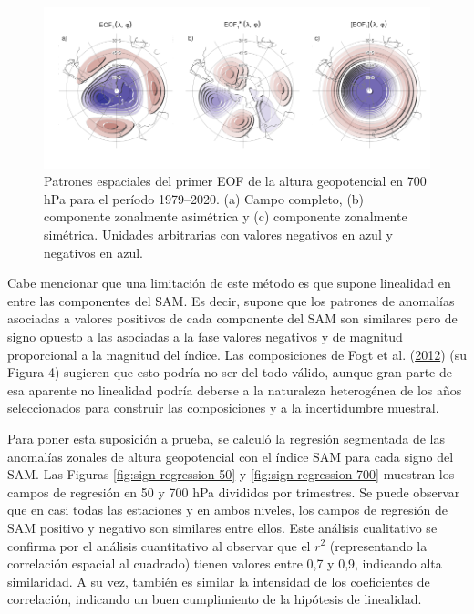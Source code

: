 \documentclass[12pt,oneside,a4paper]{reedthesis}
\begin{document}
\begin{figure}

{\centering \includegraphics{figures/30-sam/method-1} 

}

\caption{Patrones espaciales del primer EOF de la altura geopotencial en 700 hPa para el período 1979--2020. (a) Campo completo, (b) componente zonalmente asimétrica y (c) componente zonalmente simétrica. Unidades arbitrarias con valores negativos en azul y negativos en azul.}\label{fig:method}
\end{figure}

Cabe mencionar que una limitación de este método es que supone linealidad en entre las componentes del SAM.
Es decir, supone que los patrones de anomalías asociadas a valores positivos de cada componente del SAM son similares pero de signo opuesto a las asociadas a la fase valores negativos y de magnitud proporcional a la magnitud del índice.
Las composiciones de Fogt et al. (\protect\hyperlink{ref-fogt2012}{2012}) (su Figura 4) sugieren que esto podría no ser del todo válido, aunque gran parte de esa aparente no linealidad podría deberse a la naturaleza heterogénea de los años seleccionados para construir las composiciones y a la incertidumbre muestral.

Para poner esta suposición a prueba, se calculó la regresión segmentada de las anomalías zonales de altura geopotencial con el índice SAM para cada signo del SAM.
Las Figuras \ref{fig:sign-regression-50} y \ref{fig:sign-regression-700} muestran los campos de regresión en 50 y 700 hPa divididos por trimestres.
Se puede observar que en casi todas las estaciones y en ambos niveles, los campos de regresión de SAM positivo y negativo son similares entre ellos.
Este análisis cualitativo se confirma por el análisis cuantitativo al observar que el \(r^2\) (representando la correlación espacial al cuadrado) tienen valores entre 0,7 y 0,9, indicando alta similaridad.
A su vez, también es similar la intensidad de los coeficientes de correlación, indicando un buen cumplimiento de la hipótesis de linealidad.
\end{document}
